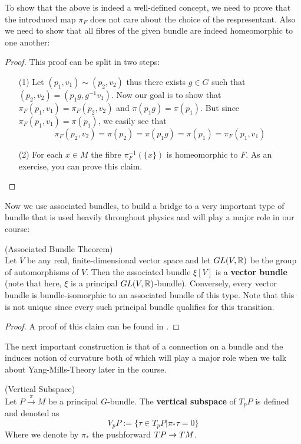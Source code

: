 To show that the above is indeed a well-defined concept, we need to prove that the introduced map $\pi_F$ does not care about the choice of the respresentant. Also we need to show that all fibres of the given bundle are indeed homeomorphic to one another:
\begin{proof} This proof can be split in two steps:
\begin{itemize}
  \item[(1)] Let $(p_1, v_1) \sim (p_2, v_2)$ thus there exists $g \in G$ such that $(p_2, v_2) = (p_1g, g^{-1}v_1)$. Now our goal is to show that $\pi_F(p_1, v_1) = \pi_F(p_2, v_2)$ and $\pi(p_1 g) = \pi(p_1)$. But since $\pi_F(p_1, v_1) = \pi(p_1)$, we easily see that
  $$ \pi_F(p_2,v_2) = \pi(p_2) = \pi(p_1g) = \pi(p_1) = \pi_F(p_1,v_1) $$

  \item[(2)] For each $x\in M$ the fibre $\pi_F^{-1}(\{x\})$ is homeomorphic to $F$. As an exercise, you can prove this claim.
\end{itemize}
\end{proof}


Now we use associated bundles, to build a bridge to a very important type of bundle that is used heavily throughout physics and will play a major role in our course:

\begin{theo} (Associated Bundle Theorem)\\
  Let $V$ be any real, finite-dimensional vector space and let $GL(V,\mathbb{R})$ be the group of automorphisms of $V$. Then the associated bundle $\xi[V]$ is a \textbf{vector bundle} (note that here, $\xi$ is a principal $GL(V, \mathbb{R})$-bundle). Conversely, every vector bundle is bundle-isomorphic to an associated bundle of this type. Note that this is not unique since every such principal bundle qualifies for this transition.
\begin{proof}
  A proof of this claim can be found in .
\end{proof}
\end{theo}

The next important construction is that of a connection on a bundle and the induces notion of curvature both of which will play a major role when we talk about Yang-Mills-Theory later in the course.

\begin{definition}
\label{Vertical_subspace}
(Vertical Subspace)\\
  Let $P \overset{\pi}{\longrightarrow} M$ be a principal $G$-bundle. The \textbf{vertical subspace} of $T_pP$ is defined and denoted as
  $$ V_pP:= \{ \tau \in T_pP | \pi_* \tau = 0 \} $$
  Where we denote by $\pi_*$ the pushforward $TP \rightarrow TM$.
\end{definition}

